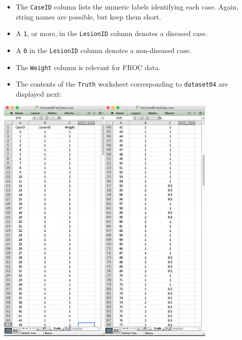 \documentclass[]{book}
\providecommand{\tightlist}{%
  \setlength{\itemsep}{0pt}\setlength{\parskip}{0pt}}
\begin{document}
\begin{itemize}
\tightlist
\item
  The \texttt{CaseID} column lists the numeric labels identifying each case. Again, string names are possible, but keep them short.
\item
  A \texttt{1}, or more, in the \texttt{LesionID} column denotes a diseased case.
\item
  A \texttt{0} in the \texttt{LesionID} column denotes a non-diseased case.
\item
  The \texttt{Weight} column is relevant for FROC data.
\item
  The contents of the \texttt{Truth} worksheet corresponding to \texttt{dataset04} are displayed next:
\end{itemize}

\includegraphics[width=0.4\textwidth,height=\textheight]{images/FROC-Truth-1.png}\includegraphics[width=0.4\textwidth,height=\textheight]{images/FROC-Truth-2.png}\in
\end{document}
